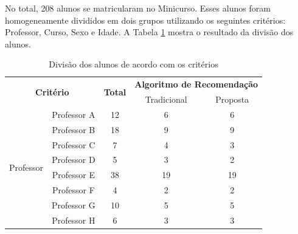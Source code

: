No total, 208 alunos se matricularam no Minicurso. Esses alunos foram homogeneamente divididos em dois grupos utilizando os
seguintes critérios: Professor, Curso, Sexo e Idade. A Tabela \ref{tab:divisao-alunos-experimento} mostra o resultado da divisão dos alunos.

\begin{table}[ht]
\footnotesize
\caption[Divisão dos alunos de acordo com os critérios]{Divisão dos alunos de acordo com os critérios}
\label{tab:divisao-alunos-experimento}
\centering
\begin{tabular}{ccccc}
  \hline
  \multicolumn{2}{c}{\multirow{2}{*}{\textbf{Critério}}}           & \multirow{2}{*}{\textbf{Total}}           & \multicolumn{2}{c}{\textbf{Algoritmo de Recomendação}} \\
                                        &                          &                                           & Tradicional          & Proposta                        \\
  \hline
  \multirow{12}{*}{Professor}           & Professor A              & 12                                        & 6                    & 6                               \\
                                        & Professor B              & 18                                        & 9                    & 9                               \\
                                        & Professor C              & 7                                         & 4                    & 3                               \\
                                        & Professor D              & 5                                         & 3                    & 2                               \\
                                        & Professor E              & 38                                        & 19                   & 19                              \\
                                        & Professor F              & 4                                         & 2                    & 2                               \\
                                        & Professor G              & 10                                        & 5                    & 5                               \\
                                        & Professor H              & 6                                         & 3                    & 3                               \\

\end{tabular}
\end{table}
